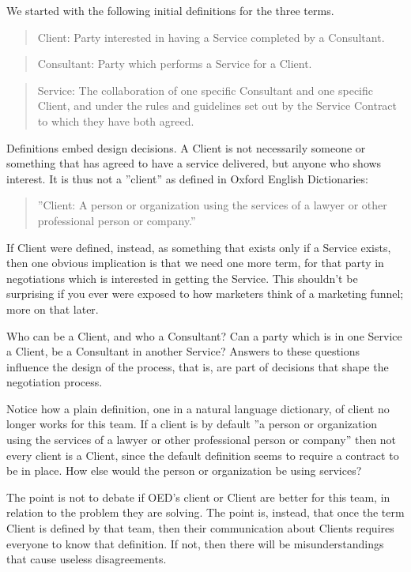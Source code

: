 \documentclass[graybox,envcountchap,sectrefs]{svmono}
\newcommand{\newterm}[1]{\begin{quote}\textsf{#1}\end{quote}}
\newcommand{\nterm}[1]{\textsf{#1}}
\begin{document}
We started with the following initial definitions for the three terms. 

\newterm{Client: Party interested in having a Service completed by a Consultant.}
\newterm{Consultant: Party which performs a Service for a Client.}
\newterm{Service: The collaboration of one specific Consultant and one specific Client, and under the rules and guidelines set out by the Service Contract to which they have both agreed.}

Definitions embed design decisions. A \nterm{Client} is not necessarily someone or something that has agreed to have a service delivered, but anyone who shows interest. It is thus not a ''client'' as defined in Oxford English Dictionaries:
\begin{quote}
	''Client: A person or organization using the services of a lawyer or other professional person or company.'' \cite{oed-client}
\end{quote}

If \nterm{Client} were defined, instead, as something that exists only if a \nterm{Service} exists, then one obvious implication is that we need one more term, for that party in negotiations which is interested in getting the \nterm{Service}. This shouldn't be surprising if you ever were exposed to how marketers think of a marketing funnel; more on that later.

Who can be a \nterm{Client}, and who a \nterm{Consultant}? Can a party which is in one \nterm{Service} a \nterm{Client}, be a \nterm{Consultant} in another \nterm{Service}? Answers to these questions influence the design of the process, that is, are part of decisions that shape the negotiation process.

Notice how a plain definition, one in a natural language dictionary, of client no longer works for this team. If a client is by default ''a person or organization using the services of a lawyer or other professional person or company'' \cite{oed-client} then not every client is a \nterm{Client}, since the default definition seems to require a contract to be in place. How else would the person or organization be using services?

The point is not to debate if OED's client or \nterm{Client} are better for this team, in relation to the problem they are solving. The point is, instead, that once the term \nterm{Client} is defined by that team, then their communication about \nterm{Clients} requires everyone to know that definition. If not, then there will be misunderstandings that cause useless disagreements.
\end{document}
